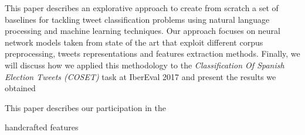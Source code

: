 \abstract

This paper describes an explorative approach to create from scratch a set of baselines for tackling tweet classification problems using natural language processing and machine learning techniques.
Our approach focuses on neural network models taken from state of the art that exploit different corpus preprocessing, tweets representations and features extraction methods.
Finally, we will discuss how we applied this methodology to the \emph{Classification Of Spanish Election Tweets (COSET)} task at IberEval 2017 and present the results we obtained

This paper describes our participation in the

handcrafted features
